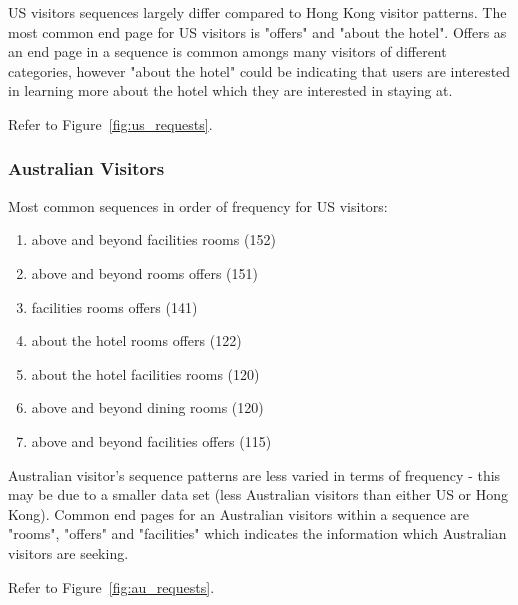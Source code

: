 US visitors sequences largely differ compared to Hong Kong visitor patterns. The most common end page for US visitors is "offers" and "about the hotel". Offers as an end page in a sequence is common amongs many visitors of different categories, however "about the hotel" could be indicating that users are interested in learning more about the hotel which they are interested in staying at.

Refer to Figure~\ref{fig:us_requests}.


\subsubsection{Australian Visitors}
\label{sec:results:countries:au}

Most common sequences in order of frequency for US visitors:
\begin{enumerate}
  \item above and beyond \ra{} facilities \ra{} rooms (152)
  \item above and beyond \ra{} rooms \ra{} offers (151)
  \item facilities \ra{} rooms \ra{} offers (141)
  \item about the hotel \ra{} rooms \ra{} offers (122)
  \item about the hotel \ra{} facilities \ra{} rooms (120)
  \item above and beyond \ra{} dining \ra{} rooms (120)
  \item above and beyond \ra{} facilities \ra{} offers (115)
\end{enumerate}

Australian visitor's sequence patterns are less varied in terms of frequency - this may be due to a smaller data set (less Australian visitors than either US or Hong Kong). Common end pages for an Australian visitors within a sequence are "rooms", "offers" and "facilities" which indicates the information which Australian visitors are seeking.

Refer to Figure~\ref{fig:au_requests}.

\newpage
\begin{landscape}
\pagestyle{empty}
\end{landscape}
